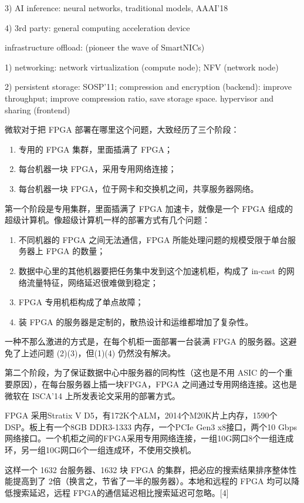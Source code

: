 3) AI inference: neural networks, traditional models, AAAI'18

4) 3rd party: general computing acceleration device

infrastructure offload: (pioneer the wave of SmartNICs)

1) networking: network virtualization (compute node); NFV (network node)

2) persistent storage: SOSP'11; compression and encryption (backend): improve throughput; improve compression ratio, save storage space.
hypervisor and sharing (frontend)



微软对于把 FPGA 部署在哪里这个问题，大致经历了三个阶段：
\begin{enumerate}
	\item 专用的 FPGA 集群，里面插满了 FPGA；
	\item 每台机器一块 FPGA，采用专用网络连接；
	\item 每台机器一块 FPGA，位于网卡和交换机之间，共享服务器网络。
\end{enumerate}

第一个阶段是专用集群，里面插满了 FPGA 加速卡，就像是一个 FPGA 组成的超级计算机。像超级计算机一样的部署方式有几个问题：

\begin{enumerate}
	\item 不同机器的 FPGA 之间无法通信，FPGA 所能处理问题的规模受限于单台服务器上 FPGA 的数量；
	\item 数据中心里的其他机器要把任务集中发到这个加速机柜，构成了 in-cast 的网络流量特征，网络延迟很难做到稳定；
	\item FPGA 专用机柜构成了单点故障；
	\item 装 FPGA 的服务器是定制的，散热设计和运维都增加了复杂性。
\end{enumerate}

一种不那么激进的方式是，在每个机柜一面部署一台装满 FPGA 的服务器。这避免了上述问题 (2)(3)，但(1)(4) 仍然没有解决。

第二个阶段，为了保证数据中心中服务器的同构性（这也是不用 ASIC 的一个重要原因），在每台服务器上插一块FPGA，FPGA 之间通过专用网络连接。这也是微软在 ISCA’14 上所发表论文采用的部署方式。

FPGA 采用Stratix V D5，有172K个ALM，2014个M20K片上内存，1590个 DSP。板上有一个8GB DDR3-1333 内存，一个PCIe Gen3 x8接口，两个10 Gbps网络接口。一个机柜之间的FPGA采用专用网络连接，一组10G网口8个一组连成环，另一组10G网口6个一组连成环，不使用交换机。

这样一个 1632 台服务器、1632 块 FPGA 的集群，把必应的搜索结果排序整体性能提高到了 2倍（换言之，节省了一半的服务器）。本地和远程的 FPGA 均可以降低搜索延迟，远程 FPGA的通信延迟相比搜索延迟可忽略。[4]

